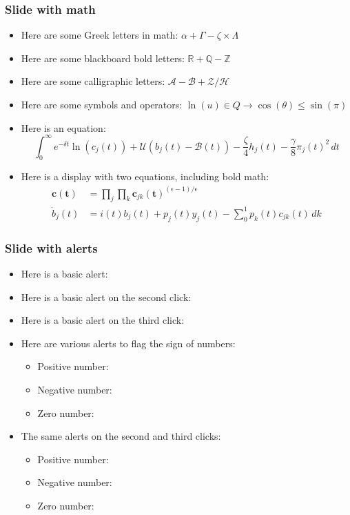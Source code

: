\documentclass[11pt,xcolor={dvipsnames},hyperref={pdftex,pdfpagemode=UseNone,hidelinks,pdfdisplaydoctitle=true},usepdftitle=false]{beamer}
\begin{document}
\begin{frame}
\frametitle{Slide with math}
\begin{itemize}
\item Here are some Greek letters in math: $\alpha + \Gamma - \zeta \times \Lambda$
\item Here are some blackboard bold letters: $\mathbb{R} + \mathbb{Q} - \mathbb{Z}$
\item Here are some calligraphic letters: $\mathcal{A} - \mathcal{B} + \mathcal{Z} / \mathcal{H}$
\item Here are some symbols and operators: $\ln(u) \in Q \to \cos(\theta) \leq \sin(\pi)$
\item Here is an equation:
\begin{equation*}
\int_{0}^{\infty}e^{-\delta t} \ln(c_{j}(t))+ \mathcal{U}(b_{j}(t) - \mathcal{B}(t))- \frac{\zeta}{4} h_{j}(t) -\frac{\gamma}{8} \pi_{j}(t)^2\,dt
\end{equation*}
\item Here is a display with two equations, including bold math:
\begin{align*}
\bm{c}(\bm{t}) &= \prod_{j} \prod_{k} \bm{c}_{jk}(\bm{t})^{(\epsilon-1)/\epsilon} \\
\dot{b}_{j}(t) &= i(t) b_{j}(t) + p_{j}(t)  y_{j}(t) - \sum_0^1 p_{k}(t) c_{jk}(t)\,dk
\end{align*}
\end{itemize}
\end{frame}

\begin{frame}
\frametitle{Slide with alerts}
\begin{itemize}
\item Here is a basic alert: 
\item Here is a basic alert on the second click: 
\item Here is a basic alert on the third click: 
\item Here are various alerts to flag the sign of numbers:
\begin{itemize}
\item Positive number: 
\item Negative number: 
\item Zero number: 
\end{itemize}
\item The same alerts on the second and third clicks:
\begin{itemize}
\item Positive number: 
\item Negative number: 
\item Zero number: 
\end{itemize}
\end{itemize}
\end{frame}
\end{document}
